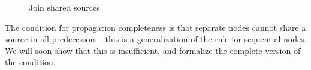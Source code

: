 \begin{figure}[H]

\caption{
Join shared sources
}
\label{snippet3.17c_graph}
\end{figure}

The condition for propagation completeness is that separate nodes cannot share a source in all predecessors - this is a generalization of the rule for sequential nodes. We will soon show that this is insufficient, and formalize the complete version of the condition.

